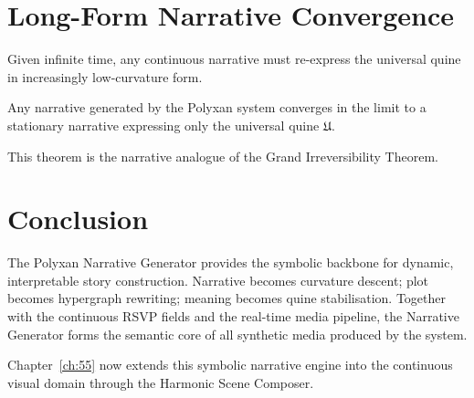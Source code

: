 \section{Long-Form Narrative Convergence}
\label{sec:54:long-form}

Given infinite time, any continuous narrative must re-express the universal
quine in increasingly low-curvature form.

\begin{theorem}
Any narrative generated by the Polyxan system converges in the limit to a
stationary narrative expressing only the universal quine $\mathfrak{U}$.
\end{theorem}

This theorem is the narrative analogue of the Grand Irreversibility Theorem.


\section{Conclusion}
\label{sec:54:conclusion}

The Polyxan Narrative Generator provides the symbolic backbone for dynamic,
interpretable story construction.  
Narrative becomes curvature descent; plot becomes hypergraph rewriting; meaning
becomes quine stabilisation.  
Together with the continuous RSVP fields and the real-time media pipeline, the
Narrative Generator forms the semantic core of all synthetic media produced by
the system.

Chapter~\ref{ch:55} now extends this symbolic narrative engine into the
continuous visual domain through the Harmonic Scene Composer.

